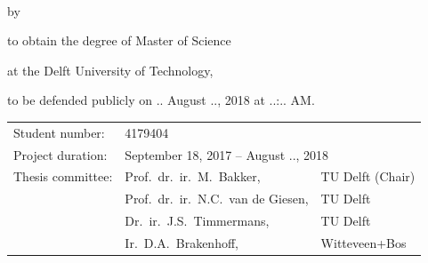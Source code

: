 \begin{titlepage}


\begin{center}

 
{\makeatletter
\largetitlestyle\color{tudelft-cyan}\fontsize{32}{32}\selectfont\@title
\makeatother}

\bigskip
\bigskip

{\makeatletter
\ifx\@subtitle\undefined\else
    \bigskip
   {\tudsffamily\fontsize{20}{20}\selectfont\@subtitle} \\
\fi
\makeatother}

\bigskip
\bigskip

by

\bigskip
\bigskip

{\makeatletter
\largetitlestyle\fontsize{16}{16}\selectfont\@author
\makeatother}

\bigskip
\bigskip

to obtain the degree of Master of Science

at the Delft University of Technology,

to be defended publicly on .. August .., 2018 at ..:.. AM.

\vfill

\begin{tabular}{lll}
    Student number: & 4179404 \\
    Project duration: & \multicolumn{2}{l}{September 18, 2017 -- August .., 2018} \\
    Thesis committee: & Prof.\ dr.\ ir.\ M.\ Bakker, & TU Delft (Chair) \\
		& Prof.\ dr.\ ir.\ N.C.\ van de Giesen, & TU Delft \\        
        & Dr.\ ir.\ J.S.\ Timmermans, & TU Delft \\
        & Ir.\ D.A.\ Brakenhoff, & Witteveen+Bos
\end{tabular}


\end{center}
\end{titlepage}
